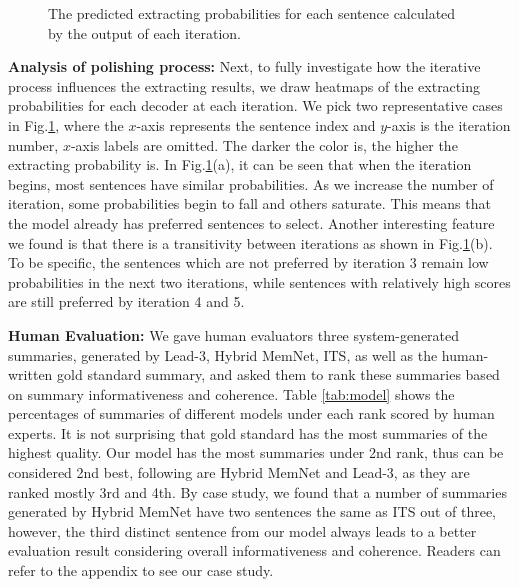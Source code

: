 \documentclass[11pt,a4paper]{article}
\begin{document}
\begin{figure} 
	\setlength{\abovecaptionskip}{0.cm}
	
	\setlength{\belowcaptionskip}{-0.cm}
	\setlength{\abovecaptionskip}{0.cm}
	
	\setlength{\belowcaptionskip}{-0.cm}
	\centering
	\caption{\label{fig:logits} The predicted extracting probabilities for each sentence calculated by the output of each iteration.} 
\end{figure}

\textbf{Analysis of polishing process:}
Next, to fully investigate how the iterative process influences the extracting results, we draw heatmaps of the extracting probabilities for each decoder at each iteration. We pick two representative cases in Fig.\ref{fig:logits}, where the $x$-axis represents the sentence index and $y$-axis is the iteration number, $x$-axis labels are omitted.
The darker the color is, the higher the extracting probability is. 
In Fig.\ref{fig:logits}(a), it can be seen that when the iteration begins, most sentences have similar probabilities.
As we increase the number of iteration, some probabilities begin to fall and others saturate. This means that the model already has preferred sentences to select.
Another interesting feature we found is that there is a transitivity between iterations as shown in Fig.\ref{fig:logits}(b). 
To be specific, the sentences which are not preferred by iteration 3 remain low probabilities in the next two iterations, while sentences with relatively high scores are still preferred by iteration 4 and 5.








\textbf{Human Evaluation:}
We gave human evaluators three system-generated summaries, generated by Lead-3, Hybrid MemNet, ITS, as well as the human-written gold standard summary, and asked them to rank these summaries based on summary informativeness and coherence. Table \ref{tab:model}  shows the percentages of summaries of different models under each rank scored by human experts.  
It is not surprising that gold standard has the most summaries of the highest quality. 
Our model has the most summaries under 2nd rank, thus can be considered 2nd best, following are Hybrid MemNet and Lead-3, as they are ranked mostly 3rd and 4th.
By case study, we found that a number of summaries generated by Hybrid MemNet have two sentences the same as ITS out of three, however, the third distinct sentence from our model always leads to a better evaluation result considering overall informativeness and coherence.
Readers can refer to the appendix to see our case study.
\end{document}
